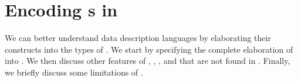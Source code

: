 \section{Encoding \ddl{}s in \ddc{}}
\label{sec:ddc-encodings}

We can better understand data description languages by elaborating
their constructs into the types of \ddc{}. We start by specifying the
complete elaboration of \ipads{}
into \ddc. We then discuss other features of \padsc{}, \padsml{},
\datascript{}, and \packettypes{} that are not found in \ipads{}.
Finally, we briefly discuss some limitations of \ddc{}.




